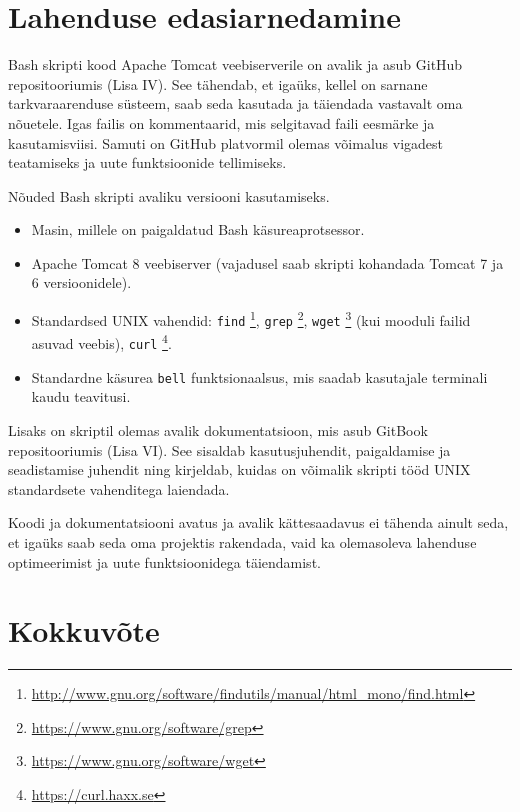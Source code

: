 \documentclass[12pt]{article}
\newcommand{\code}[1]{\texttt{#1}}
\begin{document}
  \newpage
  
  \section{Lahenduse edasiarnedamine}
  
  Bash skripti kood Apache Tomcat veebiserverile on avalik ja asub GitHub repositooriumis (Lisa IV). See tähendab, et igaüks, kellel on sarnane tarkvaraarenduse süsteem, saab seda kasutada ja täiendada vastavalt oma nõuetele. Igas failis on kommentaarid, mis selgitavad faili eesmärke ja kasutamisviisi. Samuti on GitHub platvormil olemas võimalus vigadest teatamiseks ja uute funktsioonide tellimiseks.
  
  Nõuded Bash skripti avaliku versiooni kasutamiseks.
  \begin{itemize}
    \item Masin, millele on paigaldatud Bash käsureaprotsessor.
    \item Apache Tomcat 8 veebiserver (vajadusel saab skripti kohandada Tomcat 7 ja 6 versioonidele).
    \item Standardsed UNIX vahendid: \code{find} \footnote{\url{http://www.gnu.org/software/findutils/manual/html_mono/find.html}}, \code{grep} \footnote{\url{https://www.gnu.org/software/grep}}, \code{wget} \footnote{\url{https://www.gnu.org/software/wget}} (kui mooduli failid asuvad veebis), \code{curl} \footnote{\url{https://curl.haxx.se}}.
    \item Standardne käsurea \code{bell} funktsionaalsus, mis saadab kasutajale terminali kaudu teavitusi.
  \end{itemize}
  
  Lisaks on skriptil  olemas avalik dokumentatsioon, mis asub GitBook repositooriumis (Lisa VI). See sisaldab kasutusjuhendit, paigaldamise ja seadistamise juhendit ning kirjeldab, kuidas on võimalik skripti tööd UNIX standardsete vahenditega laiendada.
  
  Koodi ja dokumentatsiooni avatus ja avalik kättesaadavus ei tähenda ainult seda, et igaüks saab seda oma projektis rakendada, vaid ka olemasoleva lahenduse optimeerimist ja uute funktsioonidega täiendamist.
  
  \newpage
  
  \section*{Kokkuvõte}
  \label{kokkuvote}
  
\end{document}
